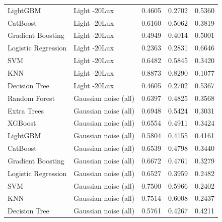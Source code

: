 \begin{tabular}{llrrr}
LightGBM & Light -20Lux & 0.4605 & 0.2702 & 0.5360 \\
CatBoost & Light -20Lux & 0.6160 & 0.5062 & 0.3819 \\
Gradient Boosting & Light -20Lux & 0.4949 & 0.4014 & 0.5001 \\
Logistic Regression & Light -20Lux & 0.2363 & 0.2831 & 0.6646 \\
SVM & Light -20Lux & 0.6482 & 0.5845 & 0.3420 \\
KNN & Light -20Lux & 0.8873 & 0.8290 & 0.1077 \\
Decision Tree & Light -20Lux & 0.4605 & 0.2702 & 0.5367 \\
Random Forest & Gaussian noise (all) & 0.6397 & 0.4825 & 0.3568 \\
Extra Trees & Gaussian noise (all) & 0.6948 & 0.5424 & 0.3031 \\
XGBoost & Gaussian noise (all) & 0.6554 & 0.4911 & 0.3424 \\
LightGBM & Gaussian noise (all) & 0.5804 & 0.4155 & 0.4161 \\
CatBoost & Gaussian noise (all) & 0.6539 & 0.4798 & 0.3440 \\
Gradient Boosting & Gaussian noise (all) & 0.6672 & 0.4761 & 0.3279 \\
Logistic Regression & Gaussian noise (all) & 0.6527 & 0.3959 & 0.2482 \\
SVM & Gaussian noise (all) & 0.7500 & 0.5966 & 0.2402 \\
KNN & Gaussian noise (all) & 0.7514 & 0.6008 & 0.2437 \\
Decision Tree & Gaussian noise (all) & 0.5761 & 0.4267 & 0.4211 \\
\bottomrule
\end{tabular}
